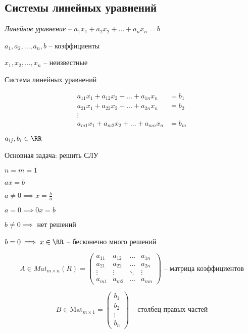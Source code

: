 \subsection{Системы линейных уравнений}

\begin{definition}
    \textit{Линейное уравнение} -- $a_1 x_1 + a_2 x_2 + \dots + a_n x_n = b$

    $a_1, a_2, \dots, a_n, b$ -- коэффициенты

    $x_1, x_2, \dots, x_n$ -- неизвестные
\end{definition}

Система линейных уравнений

\begin{align*}
    a_{11} x_1 + a_{12} x_2 + \dots + a_{1n} x_n &= b_1 \\
    a_{21} x_1 + a_{22} x_2 + \dots + a_{2n} x_n &= b_2 \\
    \vdots & \\
    a_{m1} x_1 + a_{m2} x_2 + \dots + a_{mn} x_n &= b_m
\end{align*}

$a_{ij}, b_i \in \RR$

Основная задача: решить СЛУ

\begin{example}
    $n = m = 1$

    $ax = b$

    $a \neq 0 \implies x = \frac{b}{a}$

    $a = 0 \implies 0x = b$

    $b \neq 0 \implies$ нет решений

    $b = 0 \implies x \in \RR$ -- бесконечно много решений
\end{example}

\[
    A \in Mat_{m \times n}(R) = \begin{pmatrix}
        a_{11} & a_{12} & \dots & a_{1n} \\
        a_{21} & a_{22} & \dots & a_{2n} \\
        \vdots & \vdots & \ddots & \vdots \\
        a_{m1} & a_{m2} & \dots & a_{mn}
    \end{pmatrix} \text{ -- матрица коэффициентов}
\]

\[
    B \in \text{Mat}_{m \times 1} = \begin{pmatrix}
        b_1 \\ b_2 \\ \vdots \\ b_n
    \end{pmatrix} \text{ -- столбец правых частей}
\]

